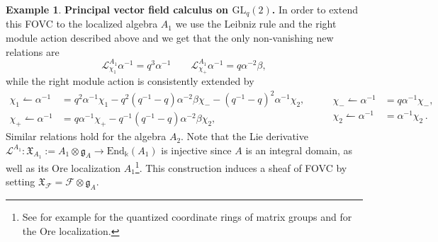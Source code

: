 \documentclass{article}
\theoremstyle{definition}
\newtheorem{example}[thm]{Example}
\newcommand{\Chi}{{\mathfrak{X}}}
\newcommand{\cF}{{\mathcal{F}}}
\begin{document}
{\begin{example} {\bf Principal vector field calculus on $\mathrm{GL}_q(2)$.}
	In order to extend this FOVC to the localized algebra $A_1$ we use the Leibniz rule and the right module action described above and we get that the only non-vanishing new relations are
	$$
	\mathscr{L}^{A_1}_{\chi_1}\alpha^{-1}=q^3\alpha^{-1}\,\,\,\,\,\,\,\,\,\,\,\, \mathscr{L}^{A_1}_{\chi_+}\alpha^{-1}=q\alpha^{-2}\beta,
	$$
	while the right module action is consistently extended by 
	\begin{equation*}
		\begin{split}
			\chi_1\leftharpoonup \alpha^{-1}&=q^2\alpha^{-1}\chi_1-q^2(q^{-1}-q)\alpha^{-2}\beta\chi_--(q^{-1}-q)^2\alpha^{-1}\chi_2,\\
			\chi_+\leftharpoonup\alpha^{-1}&=q\alpha^{-1}\chi_+-q^{-1}(q^{-1}-q)\alpha^{-2}\beta\chi_2,
		\end{split}\qquad
		\begin{split}
			\chi_-\leftharpoonup \alpha^{-1}&=q\alpha^{-1}\chi_-,\\
			\chi_2\leftharpoonup\alpha^{-1}&=\alpha^{-1}\chi_2\,.
		\end{split}
	\end{equation*}
	Similar relations hold for the algebra $A_{2}$. Note that the Lie derivative $\mathscr{L}^{A_1}\colon\mathfrak{X}_{A_{1}}:=A_1\otimes \mathfrak{g}_A\to\mathrm{End}_\Bbbk(A_1)$ is injective since $A$ is an integral domain, as well as its Ore localization $A_1$\footnote{See for example  \cite{domainLanois} for the quantized coordinate rings of matrix groups and \cite{domainRobson} for the  Ore localization.}.   This construction  induces a sheaf of FOVC by setting $\Chi_{\cF}=\cF\otimes \mathfrak{g}_A$.
	

\end{example}}
\end{document}
